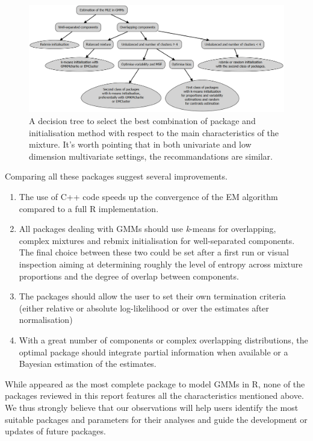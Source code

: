 \begin{figure}

{\centering \includegraphics[width=1\linewidth]{./figs/decision_tree_GMMs} 

}

\caption{A decision tree to select the best combination of package and initialisation method with respect to the main characteristics of the mixture. It's worth pointing that in both univariate and low dimension multivariate settings, the recommandations are similar.}\label{fig:decision-tree-GMMs}
\end{figure}

Comparing all these packages suggest several improvements.

\begin{enumerate}
\def\labelenumi{\arabic{enumi}.}
\item
  The use of C++ code speeds up the convergence of the EM algorithm
  compared to a full R implementation.
\item
  All packages dealing with GMMs should use \emph{k}-means for overlapping, complex mixtures and rebmix initialisation for well-separated components. The final choice between these two could be set after a first run or visual inspection aiming at determining roughly the level of entropy across mixture proportions and the degree of overlap between components.
\item
  The packages should allow the user to set their own termination criteria (either relative or absolute log-likelihood or over the estimates after normalisation)
\item
  With a great number of components or complex overlapping distributions, the optimal package should integrate partial information when available or a Bayesian estimation of the
  estimates.
\end{enumerate}

While  appeared as the most complete package to model GMMs in R, none of the packages reviewed in this report features all the characteristics mentioned above.
We thus strongly believe that our observations will help users identify the most suitable packages and parameters for their analyses and guide the development or updates of future packages.

